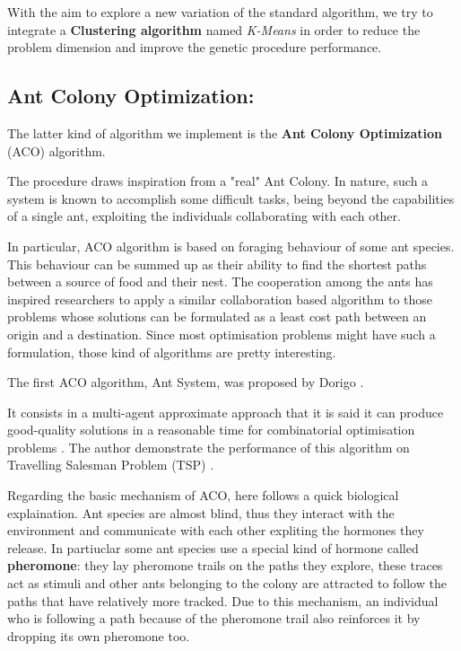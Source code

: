 With the aim to explore a new variation of the standard algorithm, we try to integrate a \textbf{Clustering algorithm} named \textit{K-Means} in order to reduce the problem dimension and improve the genetic procedure performance.

\subsection{Ant Colony Optimization:}
The latter kind of algorithm we implement is the \textbf{Ant Colony Optimization} (ACO) algorithm.

The procedure draws inspiration from a "real"  Ant  Colony. 
In nature, such a system is  known  to  accomplish  some  difficult  tasks,  being beyond  the capabilities  of  a  single  ant,  exploiting the individuals collaborating  with  each  other.  

In particular, ACO algorithm  is based on  foraging  behaviour  of  some  ant species.  
This behaviour  can  be  summed up as  their  ability  to  find  the  shortest  paths between  a source of food  and  their  nest.
The cooperation  among  the  ants  has inspired researchers to apply a similar collaboration based algorithm to those problems whose   solutions   can   be formulated as a least cost path between an origin and a destination.
Since most optimisation problems  might have such a formulation,  those kind of algorithms are  pretty interesting.

The first ACO algorithm, Ant System, was proposed by Dorigo \cite{cinque, sei, sette, otto, nove}.

It consists in a multi-agent approximate approach that it is said it can produce good-quality solutions in a reasonable time for combinatorial optimisation problems \cite{cinque}. 
The author demonstrate the performance of this algorithm on Travelling Salesman  Problem  (TSP) \cite{sei}. 

Regarding the basic mechanism of ACO, here follows a quick biological explaination.
Ant species are almost blind, thus they interact with the environment and communicate with each  other  expliting the hormones  they  release.  
In partiuclar some  ant  species use a special kind of hormone called \textbf{pheromone}: they lay pheromone trails on the paths they explore, these traces act as stimuli and other ants belonging to the colony are attracted to follow  the  paths  that  have  relatively  more  tracked.  
Due to this mechanism, an individual who is following a  path  because of the  pheromone  trail  also reinforces  it  by  dropping its  own pheromone  too.  

